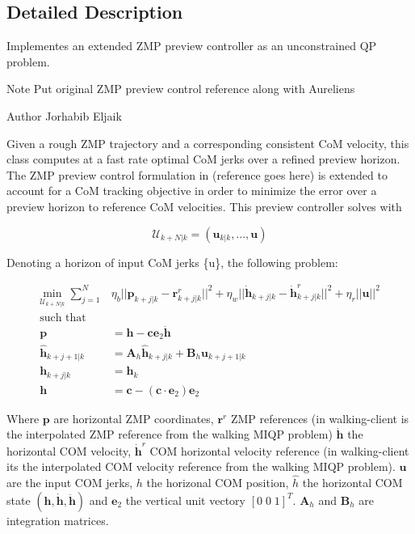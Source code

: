 \subsection{Detailed Description}
Implementes an extended Z\+MP preview controller as an unconstrained QP problem. 

\begin{DoxyNote}{Note}
Put original Z\+MP preview control reference along with Aurelien\textquotesingle{}s
\end{DoxyNote}
\begin{DoxyAuthor}{Author}
Jorhabib Eljaik
\end{DoxyAuthor}
Given a rough Z\+MP trajectory and a corresponding consistent CoM velocity, this class computes at a fast rate optimal CoM jerks over a refined preview horizon. The Z\+MP preview control formulation in (reference goes here) is extended to account for a CoM tracking objective in order to minimize the error over a preview horizon to reference CoM velocities. This preview controller solves with

\[ \mathcal{U}_{k+N|k} = (\mathbf{u}_{k|k}, ... , \mathbf{u}) \]

Denoting a horizon of input CoM jerks \{u\}, the following problem\+:

\begin{align*} \underset{\mathcal{U}_{k+N|k}}{\text{min}} \; \sum_{j=1}^{N} & \eta_b || \mathbf{p}_{k+j|k} - \mathbf{r}_{k+j|k}^r ||^2 + \eta_w ||\mathbf{\dot{h}}_{k+j|k} - \dot{\mathbf{h}}^r_{k+j|k} ||^2 + \eta_r || \mathbf{u} ||^2 \\ \text{such that}&\\ \mathbf{p} &= \mathbf{h} - \mathbf{c}\mathbf{e}_2 \mathbf{\ddot{h}} \\ \mathbf{\hat{h}}_{k+j+1|k} &= \mathbf{A}_h \hat{\mathbf{h}}_{k+j|k} + \mathbf{B}_h \mathbf{u}_{k+j+1|k} \\ \mathbf{h}_{k+j|k} &= \mathbf{h}_k\\ \mathbf{h} &= \mathbf{c} - (\mathbf{c}\cdot\mathbf{e}_2)\mathbf{e}_2 \end{align*}

Where $\mathbf{p}$ are horizontal Z\+MP coordinates, $ \mathbf{r}^r $ Z\+MP references (in walking-\/client is the interpolated Z\+MP reference from the walking M\+I\+QP problem) $ \mathbf{\dot{h}} $ the horizontal C\+OM velocity, $ \mathbf{\dot{h}}^r $ C\+OM horizontal velocity reference (in walking-\/client it\textquotesingle{}s the interpolated C\+OM velocity reference from the walking M\+I\+QP problem). $\mathbf{u}$ are the input C\+OM jerks, $h$ the horizonal C\+OM position, $\hat{h}$ the horizontal C\+OM state $ (\mathbf{h}, \mathbf{\dot{h}}, \mathbf{\ddot{h}}) $ and $\mathbf{e}_2$ the vertical unit vectory $ [0\;0\;1]^T$. $\mathbf{A}_h$ and $\mathbf{B}_h$ are integration matrices. 

